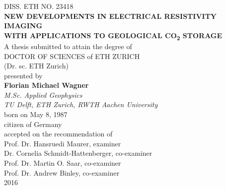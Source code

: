 \begin{titlepage}
\begin{center}
{\large
DISS. ETH NO. 23418\\
}
\vspace{1cm}
{\LARGE
\Large\bfseries{NEW DEVELOPMENTS IN ELECTRICAL RESISTIVITY IMAGING\\WITH APPLICATIONS TO GEOLOGICAL CO\textsubscript{2} STORAGE} \\[0.5cm]
}
\vfill
{\large
A thesis submitted to attain the degree of\\
\vspace{0.1cm}
DOCTOR OF SCIENCES of ETH ZURICH\\
\vspace{0.1cm}
(Dr. sc. ETH Zurich)\\
\vspace{0.4cm}
\vfill
presented by\\
\vspace{0.5cm}
\textbf{Florian Michael Wagner}\\
\vspace{0.5cm}
{\itshape
M.Sc. Applied Geophysics\\
TU Delft, ETH Zurich, RWTH Aachen University\\}
\vspace{0.25cm}
born on May 8, 1987\\
citizen of Germany\\
\vfill
accepted on the recommendation of\\[0.5cm] %


Prof. Dr. Hansruedi Maurer, examiner\\
Dr. Cornelia Schmidt-Hattenberger, co-examiner\\
Prof. Dr. Martin O. Saar, co-examiner\\
Prof. Dr. Andrew Binley, co-examiner\\
}
\vfill
{\large
2016\\}
\vfill
\end{center}

\end{titlepage}
